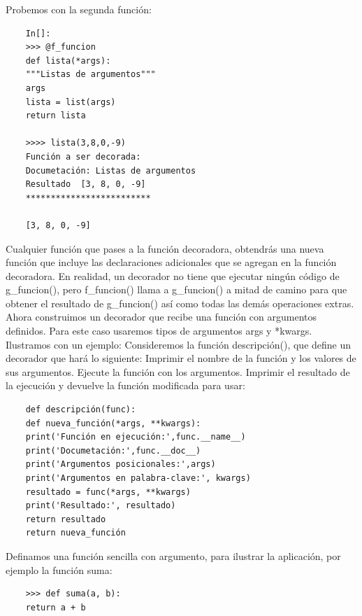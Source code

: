 Probemos con la segunda función:

\begin{lstlisting}
	In[]:
	>>> @f_funcion
	def lista(*args):
	"""Listas de argumentos"""
	args
	lista = list(args)
	return lista
	
	>>>> lista(3,8,0,-9)
	Función a ser decorada:
	Documetación: Listas de argumentos
	Resultado  [3, 8, 0, -9]
	************************* 
	
	[3, 8, 0, -9] 
\end{lstlisting}

Cualquier función que pases a la función  decoradora, obtendrás una nueva función que incluye las declaraciones adicionales que se agregan en  la función  decoradora. En realidad, un decorador 
no tiene que ejecutar ningún código de {\ttfamily g\_funcion()}, pero  {\ttfamily f\_funcion()}
llama a {\ttfamily g\_funcion()} a mitad de camino para que obtener el resultado de {\ttfamily g\_funcion()} así
como todas  las demás  operaciones extras.\\




Ahora construimos un decorador que recibe una función con argumentos definidos. Para este caso usaremos tipos de argumentos {\ttfamily*args} y {\ttfamily**kwargs}.\\


Ilustramos con un ejemplo: Consideremos la función {\ttfamily descripción()}, que define un decorador que hará lo siguiente:  Imprimir el nombre de la función y los valores de sus argumentos. Ejecute la función con los argumentos. Imprimir el resultado de la ejecución  y devuelve la función modificada para  usar:

\hspace{-2.5cm}{\ttfamily \scriptsize descripción.py}  \vspace{-0.5cm}
\begin{lstlisting}
	def descripción(func):
	def nueva_función(*args, **kwargs):
	print('Función en ejecución:',func.__name__)
	print('Documetación:',func.__doc__)
	print('Argumentos posicionales:',args)
	print('Argumentos en palabra-clave:', kwargs)
	resultado = func(*args, **kwargs)
	print('Resultado:', resultado)
	return resultado
	return nueva_función
\end{lstlisting}


Definamos una función sencilla con argumento, para ilustrar la aplicación,  por ejemplo la función suma:

\begin{lstlisting}
	>>> def suma(a, b):
	return a + b
\end{lstlisting}

